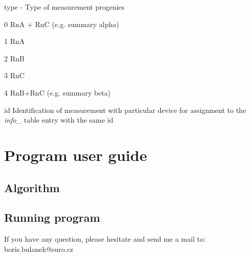 \begin{DoxyItemize}
\begin{DoxyItemize}
\item {\ttfamily type} -\/ Type of measurement progenies
\begin{DoxyItemize}
\item 0 Rn\+A + Rn\+C (e.\+g. summary alpha)
\item 1 Rn\+A
\item 2 Rn\+B
\item 3 Rn\+C
\item 4 Rn\+B+\+Rn\+C (e.\+g. summary beta)
\end{DoxyItemize}
\item {\ttfamily id} Identification of measurement with particular device for assignment to the {\itshape info\+\_} table entry with the same {\ttfamily id}
\end{DoxyItemize}
\end{DoxyItemize}\hypertarget{index_running_code}{}\section{Program user guide}\label{index_running_code}
\hypertarget{index_algorithm}{}\subsection{Algorithm}\label{index_algorithm}
\hypertarget{index_running_program}{}\subsection{Running program}\label{index_running_program}
\begin{DoxyVerb}If you have any question, please hesitate and send me a mail to: boris.bulanek@suro.cz\end{DoxyVerb}
 